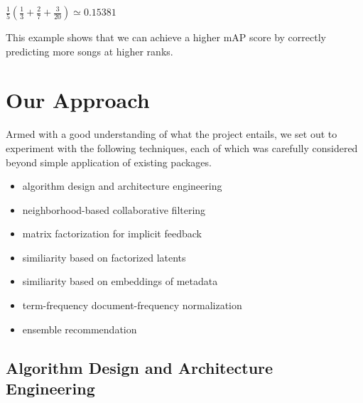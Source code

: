 \documentclass[conference]{IEEEtran}
\newcommand{\mAP}{m\textsc{AP} }
\begin{document}
\hspace{1em}$\frac{1}{5}\left(\frac{1}{3} + \frac{2}{7} + \frac{3}{20}
\right) \simeq 0.15381$

This example shows that we can achieve a higher \mAP score by correctly
predicting more songs at higher ranks.

\section{Our Approach}

Armed with a good understanding of what the project entails,
we set out to experiment with the following techniques, each of which
was carefully considered beyond simple application of existing packages.

\begin{itemize}
\item algorithm design and architecture engineering
\item neighborhood-based collaborative filtering
\item matrix factorization for implicit feedback
\item similiarity based on factorized latents
\item similiarity based on embeddings of metadata
\item term-frequency document-frequency normalization
\item ensemble recommendation
\end{itemize}

\subsection{Algorithm Design and Architecture Engineering}
\end{document}
